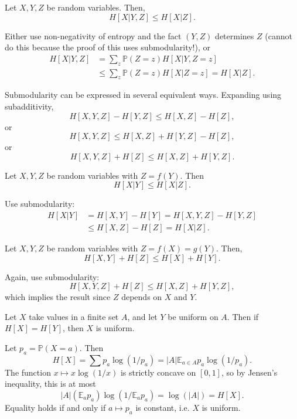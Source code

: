 \documentclass[12pt]{article}
\begin{document}
\begin{proposition}[Submodularity]
	Let $X, Y, Z$ be random variables. Then,
	\[
		H[X|Y,Z] \leq H[X|Z].
	\]
\end{proposition}

\begin{proofbox}
	Either use non-negativity of entropy and the fact $(Y, Z)$ determines $Z$ (cannot do this because the proof of this uses submodularity!), or
	\begin{align*}
		H[X|Y,Z] &= \sum_z \mathbb{P}(Z = z) H[X|Y,Z = z] \\
			 &\leq \sum_z \mathbb{P}(Z = z) H[X|Z=z] = H[X|Z].
	\end{align*}
\end{proofbox}

Submodularity can be expressed in several equivalent ways. Expanding using subadditivity,
\[
	H[X,Y,Z] - H[Y,Z] \leq H[X,Z] - H[Z],
\]
or
\[
	H[X,Y,Z] \leq H[X,Z] + H[Y,Z] - H[Z],
\]
or
\[
	H[X,Y,Z] + H[Z] \leq H[X,Z] + H[Y,Z].
\]


\begin{lemma}
	Let $X, Y, Z$ be random variables with $Z = f(Y)$. Then
	\[
		H[X|Y] \leq H[X|Z].
	\]
\end{lemma}

\begin{proofbox}
	Use submodularity:
	\begin{align*}
		H[X|Y] &= H[X,Y] - H[Y] = H[X,Y,Z] - H[Y,Z] \\
		       &\leq H[X,Z] - H[Z] = H[X|Z].
	\end{align*}
\end{proofbox}

\begin{lemma}
	Let $X, Y, Z$ be random variables with $Z = f(X) = g(Y)$. Then,
	\[
		H[X,Y] + H[Z] \leq H[X] + H[Y].
	\]
\end{lemma}

\begin{proofbox}
	Again, use submodularity:
	\[
		H[X,Y,Z] + H[Z] \leq H[X,Z] + H[Y,Z],
	\]
	which implies the result since $Z$ depends on $X$ and $Y$.
\end{proofbox}

\begin{lemma}
	Let $X$ take values in a finite set $A$, and let $Y$ be uniform on $A$. Then if $H[X] = H[Y]$, then $X$ is uniform.
\end{lemma}

\begin{proofbox}
	Let $p_a = \mathbb{P}(X = a)$. Then
	\[
		H[X] = \sum p_a \log(1/p_a) = |A| \mathbb{E}_{a \in A} p_a \log(1/p_a).
	\]
	The function $x \mapsto x \log(1/x)$ is strictly concave on $[0, 1]$, so by Jensen's inequality, this is at most
	\[
		|A| (\mathbb{E}_a p_a) \log (1 / \mathbb{E}_a p_a) = \log(|A|) = H[X].
	\]
	Equality holds if and only if $a \mapsto p_a$ is constant, i.e. $X$ is uniform.
\end{proofbox}
\end{document}
